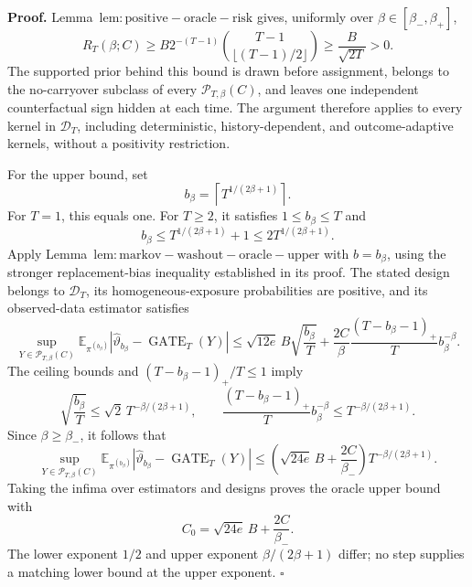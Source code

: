 \textbf{Proof.} Lemma~\(\mathrm{lem:positive-oracle-risk}\) gives, uniformly over \(\beta\in[\beta_-,\beta_+]\),
\[
R_T(\beta;C)
\ge B2^{-(T-1)}\binom{T-1}{\lfloor(T-1)/2\rfloor}
\ge\frac{B}{\sqrt{2T}}>0.
\]
The supported prior behind this bound is drawn before assignment, belongs to the no-carryover subclass of every \(\mathcal P_{T,\beta}(C)\), and leaves one independent counterfactual sign hidden at each time. The argument therefore applies to every kernel in \(\mathcal D_T\), including deterministic, history-dependent, and outcome-adaptive kernels, without a positivity restriction.

For the upper bound, set
\[
b_\beta=\left\lceil T^{1/(2\beta+1)}\right\rceil.
\]
For \(T=1\), this equals one. For \(T\ge2\), it satisfies \(1\le b_\beta\le T\) and
\[
b_\beta\le T^{1/(2\beta+1)}+1
\le2T^{1/(2\beta+1)}.
\]
Apply Lemma~\(\mathrm{lem:markov-washout-oracle-upper}\) with \(b=b_\beta\), using the stronger replacement-bias inequality established in its proof. The stated design belongs to \(\mathcal D_T\), its homogeneous-exposure probabilities are positive, and its observed-data estimator satisfies
\[
\sup_{Y\in\mathcal P_{T,\beta}(C)}
\mathbb E_{\pi^{(b_\beta)}}|\widehat\vartheta_{b_\beta}-\operatorname{GATE}_T(Y)|
\le\sqrt{12e}\,B\sqrt{\frac{b_\beta}{T}}
+\frac{2C}{\beta}\frac{(T-b_\beta-1)_+}{T}b_\beta^{-\beta}.
\]
The ceiling bounds and \((T-b_\beta-1)_+/T\le1\) imply
\[
\sqrt{\frac{b_\beta}{T}}
\le\sqrt2\,T^{-\beta/(2\beta+1)},
\qquad
\frac{(T-b_\beta-1)_+}{T}b_\beta^{-\beta}
\le T^{-\beta/(2\beta+1)}.
\]
Since \(\beta\ge\beta_-\), it follows that
\[
\sup_{Y\in\mathcal P_{T,\beta}(C)}
\mathbb E_{\pi^{(b_\beta)}}|\widehat\vartheta_{b_\beta}-\operatorname{GATE}_T(Y)|
\le\left(\sqrt{24e}\,B+\frac{2C}{\beta_-}\right)T^{-\beta/(2\beta+1)}.
\]
Taking the infima over estimators and designs proves the oracle upper bound with
\[
C_0=\sqrt{24e}\,B+\frac{2C}{\beta_-}.
\]
The lower exponent \(1/2\) and upper exponent \(\beta/(2\beta+1)\) differ; no step supplies a matching lower bound at the upper exponent. \(\square\)